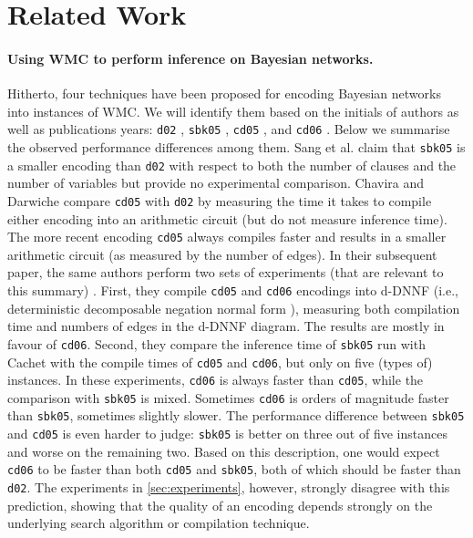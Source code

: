\documentclass{article}
\theoremstyle{definition}
\theoremstyle{remark}
\begin{document}
\section{Related Work}

\paragraph{Using WMC to perform inference on Bayesian networks.} Hitherto, four
techniques have been proposed for encoding Bayesian networks into instances of
WMC. We will identify them based on the initials of authors as well as
publications years: \texttt{d02} \cite{DBLP:conf/kr/Darwiche02}, \texttt{sbk05}
\cite{DBLP:conf/aaai/SangBK05}, \texttt{cd05} \cite{DBLP:conf/ijcai/ChaviraD05},
and \texttt{cd06} \cite{DBLP:conf/sat/ChaviraD06}. Below we summarise the
observed performance differences among them. Sang et al.
\cite{DBLP:conf/aaai/SangBK05} claim that \texttt{sbk05} is a smaller encoding
than \texttt{d02} with respect to both the number of clauses and the number of
variables but provide no experimental comparison. Chavira and Darwiche
\cite{DBLP:conf/ijcai/ChaviraD05} compare \texttt{cd05} with \texttt{d02} by
measuring the time it takes to compile either encoding into an arithmetic
circuit (but do not measure inference time). The more recent encoding
\texttt{cd05} always compiles faster and results in a smaller arithmetic circuit
(as measured by the number of edges). In their subsequent paper, the same
authors perform two sets of experiments (that are relevant to this summary)
\cite{DBLP:conf/sat/ChaviraD06}. First, they compile \texttt{cd05} and
\texttt{cd06} encodings into d-DNNF (i.e., deterministic decomposable negation
normal form \cite{DBLP:journals/jancl/Darwiche01}), measuring both compilation
time and numbers of edges in the d-DNNF diagram. The results are mostly in
favour of \texttt{cd06}. Second, they compare the inference time of
\texttt{sbk05} run with Cachet \cite{DBLP:conf/sat/SangBBKP04} with the compile
times of \texttt{cd05} and \texttt{cd06}, but only on five (types of) instances.
In these experiments, \texttt{cd06} is always faster than \texttt{cd05}, while
the comparison with \texttt{sbk05} is mixed. Sometimes \texttt{cd06} is orders
of magnitude faster than \texttt{sbk05}, sometimes slightly slower. The
performance difference between \texttt{sbk05} and \texttt{cd05} is even harder
to judge: \texttt{sbk05} is better on three out of five instances and worse on
the remaining two. Based on this description, one would expect \texttt{cd06} to
be faster than both \texttt{cd05} and \texttt{sbk05}, both of which should be
faster than \texttt{d02}. The experiments in \cref{sec:experiments}, however,
strongly disagree with this prediction, showing that the quality of an encoding
depends strongly on the underlying search algorithm or compilation technique.
\end{document}
